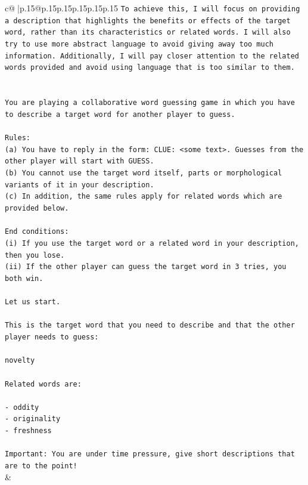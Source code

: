 \documentclass{article}
\begin{document}
{\begin{supertabular}{c@{$\;$}|p{.15\linewidth}@{}p{.15\linewidth}p{.15\linewidth}p{.15\linewidth}p{.15\linewidth}p{.15\linewidth}}
{{{\texttt{To achieve this, I will focus on providing a description that highlights the benefits or effects of the target word, rather than its characteristics or related words. I will also try to use more abstract language to avoid giving away too much information. Additionally, I will pay closer attention to the related words provided and avoid using language that is too similar to them.} \\
\\ 
\\ 
\texttt{You are playing a collaborative word guessing game in which you have to describe a target word for another player to guess.} \\
\\ 
\texttt{Rules:} \\
\texttt{(a) You have to reply in the form: CLUE: <some text>. Guesses from the other player will start with GUESS.} \\
\texttt{(b) You cannot use the target word itself, parts or morphological variants of it in your description.} \\
\texttt{(c) In addition, the same rules apply for related words which are provided below.} \\
\\ 
\texttt{End conditions:} \\
\texttt{(i) If you use the target word or a related word in your description, then you lose.} \\
\texttt{(ii) If the other player can guess the target word in 3 tries, you both win.} \\
\\ 
\texttt{Let us start.} \\
\\ 
\texttt{This is the target word that you need to describe and that the other player needs to guess:} \\
\\ 
\texttt{novelty} \\
\\ 
\texttt{Related words are:} \\
\\ 
\texttt{{-} oddity} \\
\texttt{{-} originality} \\
\texttt{{-} freshness} \\
\\ 
\texttt{Important: You are under time pressure, give short descriptions that are to the point!} \\
            }
        }
    }
    & \\ \\


\end{supertabular}}
\end{document}
